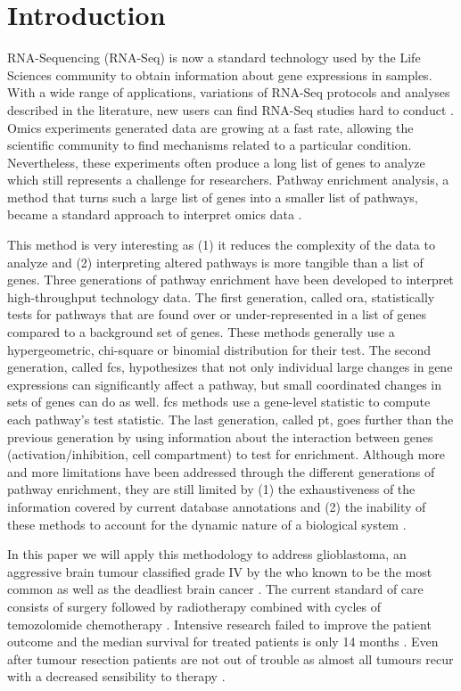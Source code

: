 \section{Introduction}

RNA-Sequencing (RNA-Seq) is now a standard technology used by the Life Sciences community to obtain information about gene expressions in samples.
With a wide range of applications, variations of RNA-Seq protocols and analyses described in the literature, new users can find RNA-Seq studies hard to conduct \cite*{Conesa2016}.
Omics experiments generated data are growing at a fast rate, allowing the scientific community to find mechanisms related to a particular condition.
Nevertheless, these experiments often produce a long list of genes to analyze which still represents a challenge for researchers. 
Pathway enrichment analysis, a method that turns such a large list of genes into a smaller list of pathways, became a standard approach to interpret omics data \cite*{Reimand2019}.

This method is very interesting as (1) it reduces the complexity of the data to analyze and (2) interpreting altered pathways is more tangible than a list of genes.
Three generations of pathway enrichment have been developed to interpret high-throughput technology data.
The first generation, called \acrfull{ora}, statistically tests for pathways that are found over or under-represented in a list of genes compared to a background set of genes.
These methods generally use a hypergeometric, chi-square or binomial distribution for their test.
The second generation, called \acrfull{fcs}, hypothesizes that not only individual large changes in gene expressions can significantly affect a pathway, but small coordinated changes in sets of genes can do as well.
\acrshort{fcs} methods use a gene-level statistic to compute each pathway's test statistic.
The last generation, called \acrfull{pt}, goes further than the previous generation by using information about the interaction between genes (activation/inhibition, cell compartment) to test for enrichment.
Although more and more limitations have been addressed through the different generations of pathway enrichment, they are still limited by (1) the exhaustiveness of the information covered by current database annotations and (2) the inability of these methods to account for the dynamic nature of a biological system \cite*{Khatri2012}.

In this paper we will apply this methodology to address glioblastoma, an aggressive brain tumour classified grade IV by the \acrfull{who} known to be the most common as well as the deadliest brain cancer \cite*{Quinones2018,Cheng2015}.
The current standard of care consists of surgery followed by radiotherapy combined with cycles of temozolomide chemotherapy \cite*{LeRhun2019}.
Intensive research failed to improve the patient outcome and the median survival for treated patients is only 14 months \cite*{Delgado-Lopez2016}.
Even after tumour resection patients are not out of trouble as almost all tumours recur with a decreased sensibility to therapy \cite*{Campos2016}.

